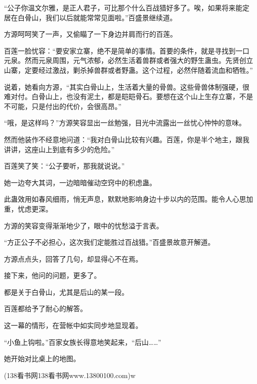 \begin{this_body}
“公子你温文尔雅，是正人君子，可比那个什么百战猎好多了。唉，如果将来能定居在白骨山，我们以后就能常常见面啦。”百盛景继续道。

方源呵呵笑了一声，又偷瞄了一下身边并肩而行的百莲。

百莲一脸忧容：“要安家立寨，绝不是简单的事情。首要的条件，就是寻找到一口元泉。然而元泉周围，元气浓郁，必然生活着兽群或者强大的野生蛊虫。先贤创立山寨，定要经过激战，剿杀掉兽群或者野蛊。这个过程，必然伴随着流血和牺牲。”

说着，她看向方源，“其实白骨山上，生活着大量的骨兽。这些骨兽体制强硬，很难对付。白骨山上，也没有泥土，都是皑皑骨石。要想在这个山上生存立寨，不是不可能，只是付出的代价，会很高昂。”

“哦，是这样吗？”方源笑容显出一丝勉强，目光中流露出一丝忧心忡忡的意味。

然而他装作不经意地问道：“我对白骨山比较有兴趣。百莲，你是半个地主，跟我讲讲，这座山上到底有多少的危险。”

百莲笑了笑：“公子要听，那我就说说。”

她一边夸大其词，一边暗暗催动空窍中的积虑蛊。

此蛊效用如春风细雨，悄无声息，默默地影响身边十步以内的范围。能令人心思加重，忧虑更深。

方源的笑容变得渐渐地少了，眼中的忧愁溢于言表。

“方正公子不必担心，这次我们定能胜过百战猎。”百盛景故意开解道。

方源点点头，回答了几句，却显得心不在焉。

接下来，他问的问题，更多了。

都是关于白骨山，尤其是后山的某一段。

百莲都给予了耐心的解答。

这一幕的情形，在营帐中如实同步地显现着。

“小鱼上钩啦。”百家女族长得意地笑起来，“后山……”

她开始对比桌上的地图。

(138看书网138看书网www.13800100.com)w

\end{this_body}

